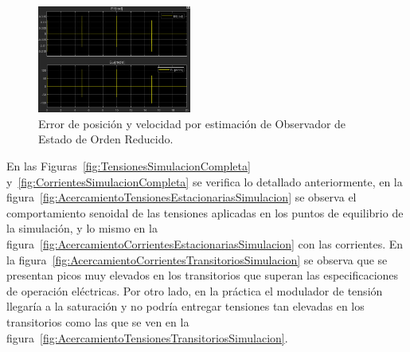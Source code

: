 \documentclass{article}
\begin{document}
\begin{figure}[H]
    \centering
    \includegraphics[width=0.45\textwidth]{Imagenes/ErroresObservadorSimulacionCompleta.png}
    \caption{Error de posición y velocidad por estimación de Observador de Estado de Orden Reducido.}
    \label{fig:ErroresObservadorSimulacionCompleta}
\end{figure}

En las Figuras~\ref{fig:TensionesSimulacionCompleta} y~\ref{fig:CorrientesSimulacionCompleta} se verifica lo detallado anteriormente, en la figura~\ref{fig:AcercamientoTensionesEstacionariasSimulacion} se observa el comportamiento senoidal de las tensiones aplicadas en los puntos de equilibrio de la simulación, y lo mismo en la figura~\ref{fig:AcercamientoCorrientesEstacionariasSimulacion} con las corrientes. En la figura~\ref{fig:AcercamientoCorrientesTransitoriosSimulacion} se observa que se presentan picos muy elevados en los transitorios que superan las especificaciones de operación eléctricas. Por otro lado, en la práctica el modulador de tensión llegaría a la saturación y no podría entregar tensiones tan elevadas en los transitorios como las que se ven en la figura~\ref{fig:AcercamientoTensionesTransitoriosSimulacion}.    
\end{document}
